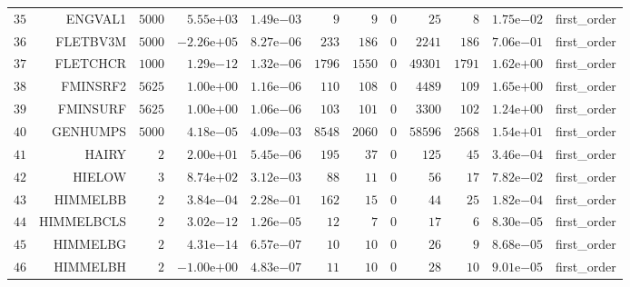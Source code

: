 \begin{longtable}{rrrrrrrrrrrr}
  \(    35\) & ENGVAL1 & \(  5000\) & \( 5.55\)e\(+03\) & \( 1.49\)e\(-03\) & \(     9\) & \(     9\) & \(     0\) & \(    25\) & \(     8\) & \( 1.75\)e\(-02\) & first\_order \\
  \(    36\) & FLETBV3M & \(  5000\) & \(-2.26\)e\(+05\) & \( 8.27\)e\(-06\) & \(   233\) & \(   186\) & \(     0\) & \(  2241\) & \(   186\) & \( 7.06\)e\(-01\) & first\_order \\
  \(    37\) & FLETCHCR & \(  1000\) & \( 1.29\)e\(-12\) & \( 1.32\)e\(-06\) & \(  1796\) & \(  1550\) & \(     0\) & \( 49301\) & \(  1791\) & \( 1.62\)e\(+00\) & first\_order \\
  \(    38\) & FMINSRF2 & \(  5625\) & \( 1.00\)e\(+00\) & \( 1.16\)e\(-06\) & \(   110\) & \(   108\) & \(     0\) & \(  4489\) & \(   109\) & \( 1.65\)e\(+00\) & first\_order \\
  \(    39\) & FMINSURF & \(  5625\) & \( 1.00\)e\(+00\) & \( 1.06\)e\(-06\) & \(   103\) & \(   101\) & \(     0\) & \(  3300\) & \(   102\) & \( 1.24\)e\(+00\) & first\_order \\
  \(    40\) & GENHUMPS & \(  5000\) & \( 4.18\)e\(-05\) & \( 4.09\)e\(-03\) & \(  8548\) & \(  2060\) & \(     0\) & \( 58596\) & \(  2568\) & \( 1.54\)e\(+01\) & first\_order \\
  \(    41\) & HAIRY & \(     2\) & \( 2.00\)e\(+01\) & \( 5.45\)e\(-06\) & \(   195\) & \(    37\) & \(     0\) & \(   125\) & \(    45\) & \( 3.46\)e\(-04\) & first\_order \\
  \(    42\) & HIELOW & \(     3\) & \( 8.74\)e\(+02\) & \( 3.12\)e\(-03\) & \(    88\) & \(    11\) & \(     0\) & \(    56\) & \(    17\) & \( 7.82\)e\(-02\) & first\_order \\
  \(    43\) & HIMMELBB & \(     2\) & \( 3.84\)e\(-04\) & \( 2.28\)e\(-01\) & \(   162\) & \(    15\) & \(     0\) & \(    44\) & \(    25\) & \( 1.82\)e\(-04\) & first\_order \\
  \(    44\) & HIMMELBCLS & \(     2\) & \( 3.02\)e\(-12\) & \( 1.26\)e\(-05\) & \(    12\) & \(     7\) & \(     0\) & \(    17\) & \(     6\) & \( 8.30\)e\(-05\) & first\_order \\
  \(    45\) & HIMMELBG & \(     2\) & \( 4.31\)e\(-14\) & \( 6.57\)e\(-07\) & \(    10\) & \(    10\) & \(     0\) & \(    26\) & \(     9\) & \( 8.68\)e\(-05\) & first\_order \\
  \(    46\) & HIMMELBH & \(     2\) & \(-1.00\)e\(+00\) & \( 4.83\)e\(-07\) & \(    11\) & \(    10\) & \(     0\) & \(    28\) & \(    10\) & \( 9.01\)e\(-05\) & first\_order \\

\end{longtable}

